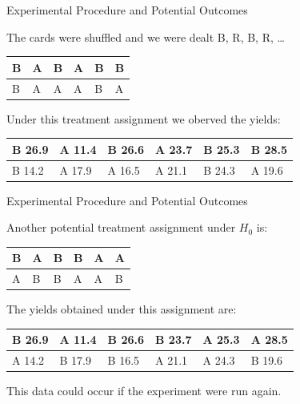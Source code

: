 \documentclass[9pt,ignorenonframetext,]{beamer}
\begin{document}
\begin{frame}{Experimental Procedure and Potential Outcomes}

The cards were shuffled and we were dealt B, R, B, R, \ldots{}

\begin{table}[]
\centering
\label{my-label}
\begin{tabular}{|l|l|l|l|l|l|}
\hline
B  & A  & B  & A  & B   & B  \\ \hline
B  & A  & A  & A  & B  & A  \\ \hline
\end{tabular}
\end{table}

Under this treatment assignment we oberved the yields:

\begin{table}[]
\centering
\label{my-label}
\begin{tabular}{|l|l|l|l|l|l|}
\hline
B 26.9 & A 11.4 & B 26.6 & A 23.7 & B 25.3  & B 28.5 \\ \hline
B 14.2 & A 17.9 & A 16.5 & A 21.1 & B 24.3 & A 19.6 \\ \hline
\end{tabular}
\end{table}

\end{frame}

\begin{frame}{Experimental Procedure and Potential Outcomes}

Another potential treatment assignment under \(H_0\) is:

\begin{table}[]
\centering
\label{my-label}
\begin{tabular}{|l|l|l|l|l|l|}
\hline
B  & A  & B  & B  & A   & A  \\ \hline
A  & B  & B  & A  & A  & B  \\ \hline
\end{tabular}
\end{table}

The yields obtained under this assignment are:

\begin{table}[]
\centering
\label{my-label}
\begin{tabular}{|l|l|l|l|l|l|}
\hline
B 26.9 & A 11.4 & B 26.6 & B 23.7 & A 25.3  & A 28.5 \\ \hline
A 14.2 & B 17.9 & B 16.5 & A 21.1 & A 24.3 & B 19.6 \\ \hline
\end{tabular}
\end{table}

This data could occur if the experiment were run again.

\end{frame}
\end{document}
